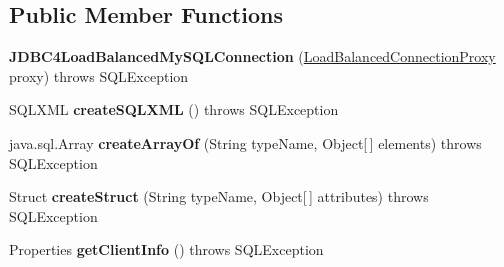 \subsection*{Public Member Functions}
\begin{DoxyCompactItemize}
\item 
\mbox{\label{classcom_1_1mysql_1_1jdbc_1_1_j_d_b_c4_load_balanced_my_s_q_l_connection_ac624e6541d18ca451ceed4b35fab6f7f}} 
{\bfseries J\+D\+B\+C4\+Load\+Balanced\+My\+S\+Q\+L\+Connection} (\mbox{\hyperlink{classcom_1_1mysql_1_1jdbc_1_1_load_balanced_connection_proxy}{Load\+Balanced\+Connection\+Proxy}} proxy)  throws S\+Q\+L\+Exception 
\item 
\mbox{\label{classcom_1_1mysql_1_1jdbc_1_1_j_d_b_c4_load_balanced_my_s_q_l_connection_ab9a336f213541ecc62919b1f27245f20}} 
S\+Q\+L\+X\+ML {\bfseries create\+S\+Q\+L\+X\+ML} ()  throws S\+Q\+L\+Exception 
\item 
\mbox{\label{classcom_1_1mysql_1_1jdbc_1_1_j_d_b_c4_load_balanced_my_s_q_l_connection_a57ab79b5e722dc5163ee09c561103b3b}} 
java.\+sql.\+Array {\bfseries create\+Array\+Of} (String type\+Name, Object\mbox{[}$\,$\mbox{]} elements)  throws S\+Q\+L\+Exception 
\item 
\mbox{\label{classcom_1_1mysql_1_1jdbc_1_1_j_d_b_c4_load_balanced_my_s_q_l_connection_a3473e19b167147d0529e97bfe885f994}} 
Struct {\bfseries create\+Struct} (String type\+Name, Object\mbox{[}$\,$\mbox{]} attributes)  throws S\+Q\+L\+Exception 
\item 
\mbox{\label{classcom_1_1mysql_1_1jdbc_1_1_j_d_b_c4_load_balanced_my_s_q_l_connection_ac0c70c32540cd7bc667fb7dec56fb08f}} 
Properties {\bfseries get\+Client\+Info} ()  throws S\+Q\+L\+Exception 
\item 
\mbox{\label{classcom_1_1mysql_1_1jdbc_1_1_j_d_b_c4_load_balanced_my_s_q_l_connection_a62f110fe1dc36ebf6b19ea6aefcf1a96}} 

\end{DoxyCompactItemize}
